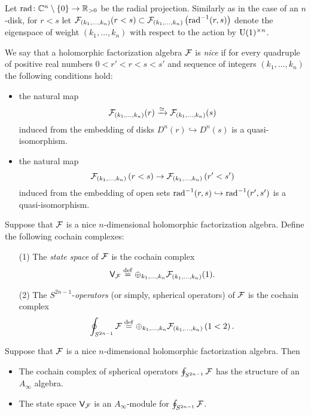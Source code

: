 \documentclass[11pt]{amsart}
\def\U{{\rm U}}
\begin{document}
Let ${\rm rad} \colon \mathbb C^n \setminus \{0\} \to \mathbb R_{>0}$ be the radial projection.
Similarly as in the case of an $n$-disk, for $r < s$ let $\mathcal F_{(k_1,\ldots, k_n)}(r<s) \subset \mathcal F_{(k_1,\ldots, k_n)}\left({\rm rad}^{-1}(r, s) \right)$ denote the eigenspace of weight $(k_1,\ldots, k_n)$ with respect to the action by $\U(1)^{\times n}$. 

We say that a holomorphic factorization algebra $\mathcal F$ is {\em nice} if for every quadruple of positive real numbers $0 < r' < r < s < s'$ and sequence of integers $(k_1, \ldots, k_n)$ the following conditions hold:
\begin{itemize}
\item the natural map 
\[
\mathcal F_{(k_1,\ldots, k_n)}(r) \xrightarrow{\simeq} \mathcal F_{(k_1,\ldots, k_n)}(s)
\]
induced from the embedding of disks $D^n(r) \hookrightarrow D^n (s)$ is a quasi-isomorphism.
\item the natural map
\[ 
\mathcal F_{(k_1,\ldots, k_n)}\left(r < s \right) \to \mathcal F_{(k_1,\ldots, k_n)}\left(r' < s' \right) 
\]
induced from the embedding of open sets ${\rm rad}^{-1}(r,s) \hookrightarrow {\rm rad}^{-1} (r',s')$ is a quasi-isomorphism.
\end{itemize}

\begin{dfn}
Suppose that $\mathcal F$ is a nice $n$-dimensional holomorphic factorization algebra. 
Define the following cochain complexes:
\begin{itemize}
\item[(1)] 
The {\em state space} of $\mathcal F$ is the cochain complex
\[
\mathsf V_{\mathcal F} \overset{\rm def}{=} \oplus_{k_1,\ldots, k_n} \mathcal F_{(k_1,\ldots, k_n)}(1) .
\]
\item[(2)]
The $S^{2n-1}$-{\em operators} (or simply, spherical operators) of $\mathcal F$ is the cochain complex
\[
\oint_{S^{2n-1}} \mathcal F \overset{\rm def}{=} \oplus_{k_1,\ldots, k_n} \mathcal F _{(k_1,\ldots, k_n)}\left(1 < 2\right) .
\]
\end{itemize}
\end{dfn}

\begin{thm}
Suppose that $\mathcal F$ is a nice $n$-dimensional holomorphic factorization algebra. 
Then
\begin{itemize}
\item The cochain complex of spherical operators $\oint_{S^{2n-1}} \mathcal F$ has the structure of an $A_\infty$ algebra.
\item The state space $\mathsf V_\mathcal F$ is an $A_\infty$-module for $\oint_{S^{2n-1}} \mathcal F$. 
\end{itemize}
\end{thm}
\end{document}
